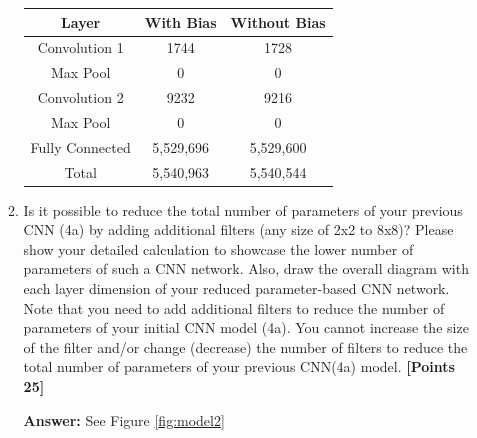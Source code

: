 \documentclass[12pt]{article}
\begin{document}
\begin{enumerate}
\begin{enumerate}
                    \begin{table}[h]
                        \centering
                        \begin{tabular}{|ccc|}
                            \hline
                            \textbf{Layer}  & \textbf{With Bias} & \textbf{Without Bias} \\
                            \hline
                            Convolution 1   & 1744               & 1728                  \\
                            \hline
                            Max Pool        & 0                  & 0                     \\
                            \hline
                            Convolution 2   & 9232               & 9216                  \\
                            \hline
                            Max Pool        & 0                  & 0                     \\
                            \hline
                            Fully Connected & 5,529,696          & 5,529,600             \\
                            \hline
                            Total           & 5,540,963          & 5,540,544             \\
                            \hline
                        \end{tabular}
                    \end{table}
              \item Is it possible to reduce the total number of parameters of
                    your previous CNN (4a) by adding additional filters (any
                    size of 2x2 to 8x8)? Please show your detailed calculation
                    to showcase the lower number of parameters of such a CNN
                    network. Also, draw the overall diagram with each layer
                    dimension of your reduced parameter-based CNN network. Note
                    that you need to add additional filters to reduce the number
                    of parameters of your initial CNN model (4a). You cannot
                    increase the size of the filter and/or change (decrease) the
                    number of filters to reduce the total number of parameters
                    of your previous CNN(4a) model. \textbf{[Points 25]}

                    \textbf{Answer:}
                    See Figure \ref{fig:model2}


\end{enumerate}
\end{enumerate}
\end{document}
